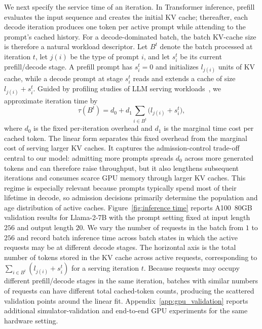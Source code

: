 We next specify the service time of an iteration. In Transformer inference, prefill evaluates the input sequence and creates the initial KV cache; thereafter, each decode iteration produces one token per active prompt while attending to the prompt's cached history. For a decode-dominated batch, the batch KV-cache size is therefore a natural workload descriptor. Let \(B^t\) denote the batch processed at iteration \(t\), let \(j(i)\) be the type of prompt \(i\), and let \(s_i^t\) be its current prefill/decode stage. A prefill prompt has \(s_i^t=0\) and initializes \(l_{j(i)}\) units of KV cache, while a decode prompt at stage \(s_i^t\) reads and extends a cache of size \(l_{j(i)}+s_i^t\). Guided by profiling studies of LLM serving workloads~\citep{agrawal2023sarathi,kwon2023efficient,zhong2024distserve}, we approximate iteration time by
\begin{equation}
\label{eq:time_consump}
    \tau(B^t) = d_0 + d_1 \sum_{i\in B^t} \bigl(l_{j(i)} + s_i^t\bigr),
\end{equation}
where \( d_0 \) is the fixed per-iteration overhead and \( d_1 \) is the marginal time cost per cached token. The linear form separates this fixed overhead from the marginal cost of serving larger KV caches. It captures the admission-control trade-off central to our model: admitting more prompts spreads \(d_0\) across more generated tokens and can therefore raise throughput, but it also lengthens subsequent iterations and consumes scarce GPU memory through larger KV caches. This regime is especially relevant because prompts typically spend most of their lifetime in decode, so admission decisions primarily determine the population and age distribution of active caches. Figure~\ref{fig:inference time} reports A100~80GB validation results for Llama-2-7B with the prompt setting fixed at input length \(256\) and output length \(20\). We vary the number of requests in the batch from \(1\) to \(256\) and record batch inference time across batch states in which the active requests may be at different decode stages. The horizontal axis is the total number of tokens stored in the KV cache across active requests, corresponding to \(\sum_{i\in B^t}(l_{j(i)}+s_i^t)\) for a serving iteration \(t\). Because requests may occupy different prefill/decode stages in the same iteration, batches with similar numbers of requests can have different total cached-token counts, producing the scattered validation points around the linear fit. Appendix~\ref{app:gpu_validation} reports additional simulator-validation and end-to-end GPU experiments for the same hardware setting.

